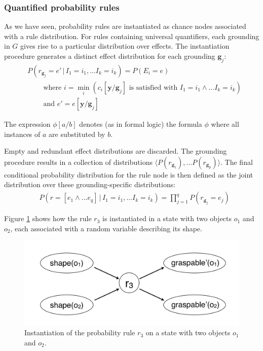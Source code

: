 \subsubsection*{Quantified probability rules}

As we have seen, probability rules are instantiated as chance nodes associated with a rule distribution.  For rules containing universal quantifiers, each grounding in $G$ gives rise to a particular distribution over effects.  The instantiation procedure generates a distinct effect distribution for each grounding $\mathbf{g}_j$: 
\begin{align}
& P(r_{\mathbf{g}_j}\!=\!e' \, | \, I_1\!=\!i_1,... I_k\!=\!i_k) = P(E_i = e) \label{eq:quantifruledistrib}
 \\
& \; \; \; \; \; \; \; \; \text{where } i = \min_i (c_i[\mathbf{y} / \mathbf{g}_j]\text{ is satisfied with } I_1\!=\!i_1 \land ... I_k\!=\!i_k) \nonumber \\ 
& \; \; \; \; \; \; \; \; \text{and } e' = e [\mathbf{y} / \mathbf{g}_j] \nonumber
\end{align}

The expression $\phi[a/b]$ denotes (as in formal logic) the formula $\phi$ where all instances of $a$ are substituted by $b$.

Empty and redundant effect distributions are discarded. The grounding procedure results in a  collection of distributions $ \langle P(r_{\mathbf{g}_1}),... P(r_{\mathbf{g}_p}) \rangle$.    The final conditional probability distribution for the rule node is then defined as the joint distribution over these grounding-specific distributions: 
\begin{align}
& P(r\!=\![e_1 \land ... e_{q}] \, | \, I_1\!=\!i_1,... I_k\!=\!i_k) = \prod_{j=1}^{q} P(r_{\mathbf{g}_j}\!=\!e_j)
\end{align}

Figure \ref{fig:quantinstantitionprob} shows how the rule $r_3$ is instantiated in a state with two objects $o_1$ and $o_2$, each associated with a random variable describing its shape.

\begin{figure}[h]
\centering
\includegraphics[scale=0.25]{imgs/quantruleinstantiation.pdf}
\caption{Instantiation of the probability rule $r_3$ on a state with two objects $o_1$ and $o_2$.}
\label{fig:quantinstantitionprob}
\end{figure}

